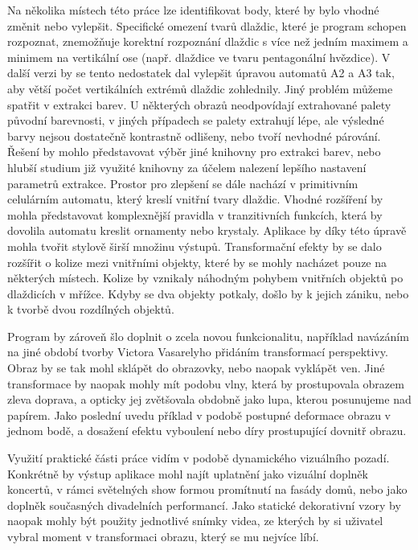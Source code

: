 Na několika místech této práce lze identifikovat body, které by bylo vhodné změnit nebo vylepšit. Specifické omezení tvarů dlaždic, které je program schopen rozpoznat, znemožňuje korektní rozpoznání dlaždic s více než jedním maximem a minimem na vertikální ose (např. dlaždice ve tvaru pentagonální hvězdice). V další verzi by se tento nedostatek dal vylepšit úpravou automatů A2 a A3 tak, aby větší počet vertikálních extrémů dlaždic zohlednily. Jiný problém můžeme spatřit v extrakci barev. U některých obrazů neodpovídají extrahované palety původní barevnosti, v jiných případech se palety extrahují lépe, ale výsledné barvy nejsou dostatečně kontrastně odlišeny, nebo tvoří nevhodné párování. Řešení by mohlo představovat výběr jiné knihovny pro extrakci barev, nebo hlubší studium již využité knihovny za účelem nalezení lepšího nastavení parametrů extrakce. Prostor pro zlepšení se dále nachází v primitivním celulárním automatu, který kreslí vnitřní tvary dlaždic. Vhodné rozšíření by mohla představovat komplexnější pravidla v tranzitivních funkcích, která by dovolila automatu kreslit ornamenty nebo krystaly. Aplikace by díky této úpravě mohla tvořit stylově širší množinu výstupů. Transformační efekty by se dalo rozšířit o kolize mezi vnitřními objekty, které by se mohly nacházet pouze na některých místech. Kolize by vznikaly náhodným pohybem vnitřních objektů po dlaždicích v mřížce. Kdyby se dva objekty potkaly, došlo by k jejich zániku, nebo k tvorbě dvou rozdílných objektů.

Program by zároveň šlo doplnit o zcela novou funkcionalitu, například navázáním na jiné období tvorby Victora Vasarelyho přidáním transformací perspektivy. Obraz by se tak mohl sklápět do obrazovky, nebo naopak vyklápět ven. Jiné transformace by naopak mohly mít podobu vlny, která by prostupovala obrazem zleva doprava, a opticky jej zvětšovala obdobně jako lupa, kterou posunujeme nad papírem. Jako poslední uvedu příklad v podobě postupné deformace obrazu v jednom bodě, a dosažení efektu vyboulení nebo díry prostupující dovnitř obrazu.

Využití praktické části práce vidím v podobě dynamického vizuálního pozadí. Konkrétně by výstup aplikace mohl najít uplatnění jako vizuální doplněk koncertů, v rámci světelných show formou promítnutí na fasády domů, nebo jako doplněk současných divadelních performancí. Jako statické dekorativní vzory by naopak mohly být použity jednotlivé snímky videa, ze kterých by si uživatel vybral moment v transformaci obrazu, který se mu nejvíce líbí.


%
